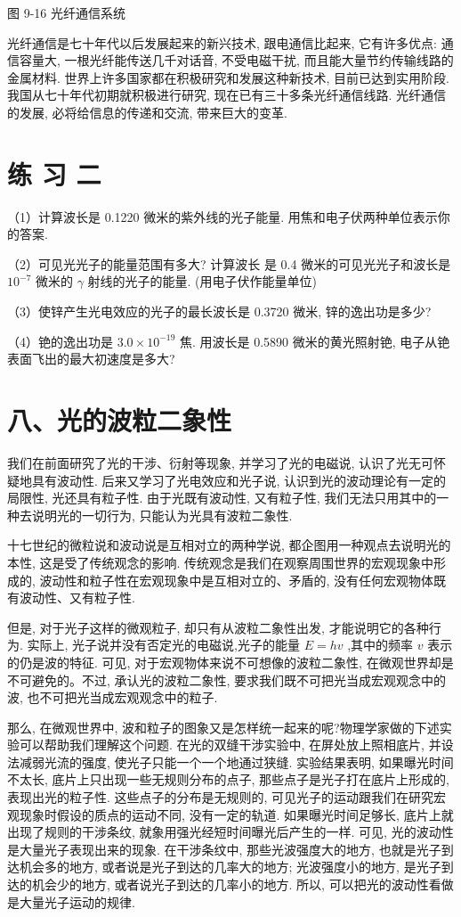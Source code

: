 \documentclass[10pt]{article}
\begin{document}
图 9-16 光纤通信系统

光纤通信是七十年代以后发展起来的新兴技术, 跟电通信比起来, 它有许多优点: 通信容量大, 一根光纤能传送几千对话音, 不受电磁干扰, 而且能大量节约传输线路的金属材料. 世界上许多国家都在积极研究和发展这种新技术, 目前已达到实用阶段. 我国从七十年代初期就积极进行研究, 现在已有三十多条光纤通信线路. 光纤通信的发展, 必将给信息的传递和交流, 带来巨大的变革.

\section*{练 习 二}

（1）计算波长是 0.1220 微米的紫外线的光子能量. 用焦和电子伏两种单位表示你的答案.

（2）可见光光子的能量范围有多大? 计算波长 是 0.4 微米的可见光光子和波长是 \({10}^{-7}\) 微米的 \(\gamma\) 射线的光子的能量. (用电子伏作能量单位)

（3）使锌产生光电效应的光子的最长波长是 0.3720 微米, 锌的逸出功是多少?

（4）铯的逸出功是 \({3.0} \times {10}^{-{19}}\) 焦. 用波长是 0.5890 微米的黄光照射铯, 电子从铯表面飞出的最大初速度是多大?

\section*{八、光的波粒二象性}

我们在前面研究了光的干涉、衍射等现象, 并学习了光的电磁说, 认识了光无可怀疑地具有波动性. 后来又学习了光电效应和光子说, 认识到光的波动理论有一定的局限性, 光还具有粒子性. 由于光既有波动性, 又有粒子性, 我们无法只用其中的一种去说明光的一切行为, 只能认为光具有波粒二象性.

十七世纪的微粒说和波动说是互相对立的两种学说, 都企图用一种观点去说明光的本性, 这是受了传统观念的影响. 传统观念是我们在观察周围世界的宏观现象中形成的, 波动性和粒子性在宏观现象中是互相对立的、矛盾的, 没有任何宏观物体既有波动性、又有粒子性.

但是, 对于光子这样的微观粒子, 却只有从波粒二象性出发, 才能说明它的各种行为. 实际上, 光子说并没有否定光的电磁说,光子的能量 \(E = {hv}\) ,其中的频率 \(v\) 表示的仍是波的特征. 可见, 对于宏观物体来说不可想像的波粒二象性, 在微观世界却是不可避免的。不过, 承认光的波粒二象性, 要求我们既不可把光当成宏观观念中的波, 也不可把光当成宏观观念中的粒子.

那么, 在微观世界中, 波和粒子的图象又是怎样统一起来的呢?物理学家做的下述实验可以帮助我们理解这个问题. 在光的双缝干涉实验中, 在屏处放上照相底片, 并设法减弱光流的强度, 使光子只能一个一个地通过狭缝. 实验结果表明, 如果曝光时间不太长, 底片上只出现一些无规则分布的点子, 那些点子是光子打在底片上形成的, 表现出光的粒子性. 这些点子的分布是无规则的, 可见光子的运动跟我们在研究宏观现象时假设的质点的运动不同, 没有一定的轨道. 如果曝光时间足够长, 底片上就出现了规则的干涉条纹, 就象用强光经短时间曝光后产生的一样. 可见, 光的波动性是大量光子表现出来的现象. 在干涉条纹中, 那些光波强度大的地方, 也就是光子到达机会多的地方, 或者说是光子到达的几率大的地方; 光波强度小的地方, 是光子到达的机会少的地方, 或者说光子到达的几率小的地方. 所以, 可以把光的波动性看做是大量光子运动的规律.
\end{document}
